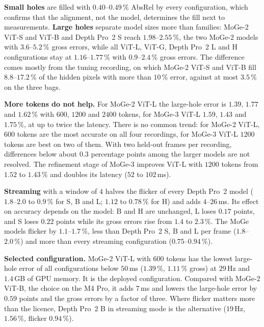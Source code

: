 \documentclass[conference]{IEEEtran}
\begin{document}
\textbf{Small holes} are filled with \(0.40\)--\(0.49\,\%\) AbsRel by every
configuration, which confirms that the alignment, not the model, determines the
fill next to measurements. \textbf{Large holes} separate model sizes more
than families: MoGe-2 ViT-S and ViT-B and Depth Pro~2 S reach
\(1.98\)--\(2.55\,\%\), the two MoGe-2 models with \(3.6\)--\(5.2\,\%\) gross
errors, while all ViT-L, ViT-G, Depth Pro~2 L and H
configurations stay at \(1.16\)--\(1.77\,\%\) with \(0.9\)--\(2.4\,\%\) gross
errors. The difference comes mostly from the tuning recording, on which MoGe-2
ViT-S and ViT-B fill \(8.8\)--\(17.2\,\%\) of the hidden pixels with more than
\(10\,\%\) error, against at most \(3.5\,\%\) on the three bags.

\textbf{More tokens do not help.} For MoGe-2 ViT-L the large-hole error is
\(1.39\), \(1.77\) and \(1.62\,\%\) with \(600\), \(1200\) and \(2400\) tokens,
for MoGe-3 ViT-L \(1.59\), \(1.43\) and \(1.75\,\%\), at up to twice the latency.
There is no common trend: for MoGe-2 ViT-L, \(600\) tokens are the most
accurate on all four recordings, for MoGe-3 ViT-L \(1200\) tokens are best on
two of them. With two held-out frames per recording, differences below about
\(0.3\) percentage points among the larger models are not resolved. The refinement stage of MoGe-3 improves ViT-L with
\(1200\) tokens from \(1.52\) to \(1.43\,\%\) and doubles its latency (\(52\) to
\(102\,\)ms).

\textbf{Streaming} with a window of \(4\) halves the flicker of every Depth Pro~2
model (\(1.8\)--\(2.0\) to \(0.9\,\%\) for S, B and L; \(1.12\) to \(0.78\,\%\)
for H) and adds \(4\)--\(26\,\)ms. Its effect on accuracy depends on the model:
B and H are unchanged, L loses \(0.17\) points, and S loses \(0.22\) points
while its gross errors rise from \(1.4\) to \(2.3\,\%\). The MoGe models flicker
by \(1.1\)--\(1.7\,\%\), less than Depth Pro~2 S, B and L per frame
(\(1.8\)--\(2.0\,\%\)) and more than every streaming configuration
(\(0.75\)--\(0.94\,\%\)).

\textbf{Selected configuration.} MoGe-2 ViT-L with \(600\) tokens has the
lowest large-hole error of all configurations below \(50\,\)ms (\(1.39\,\%\),
\(1.11\,\%\) gross) at \(29\,\)Hz and \(1.4\,\)GB of GPU memory. It is the deployed configuration. Compared with
MoGe-2 ViT-B, the choice on the M4 Pro, it adds \(7\,\)ms and lowers the
large-hole error by \(0.59\) points and the gross errors by a factor of three.
Where flicker matters more than the licence, Depth Pro~2 B in streaming mode is
the alternative (\(19\,\)Hz, \(1.56\,\%\), flicker \(0.94\,\%\)).
\end{document}
